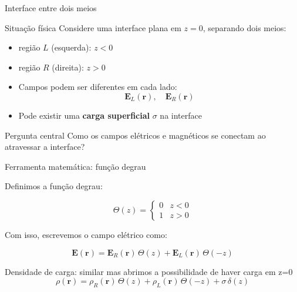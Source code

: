 \documentclass[aspectratio=169]{beamer}
\begin{document}
\begin{frame}{Interface entre dois meios}
\small

\begin{block}{Situação física}
Considere uma interface plana em \(z=0\), separando dois meios:
\begin{itemize}
\item região \(L\) (esquerda): \(z<0\)
\item região \(R\) (direita): \(z>0\)
\end{itemize}
\end{block}

\vspace{0.1cm}

\begin{itemize}\setlength{\itemsep}{2pt}
\item Campos podem ser diferentes em cada lado:
\[
\mathbf{E}_L(\mathbf{r}), \quad \mathbf{E}_R(\mathbf{r})
\]
\item Pode existir uma \textbf{carga superficial} \(\sigma\) na interface
\end{itemize}

\vspace{0.1cm}

\begin{alertblock}{Pergunta central}
Como os campos elétricos e magnéticos se conectam ao atravessar a interface?
\end{alertblock}

\end{frame}

\begin{frame}{Ferramenta matemática: função degrau}
\small

Definimos a função degrau:

\begin{equation}
\Theta(z)=
\begin{cases}
0 & z<0 \\
1 & z>0
\end{cases}
\tag{2.44}
\end{equation}

\vspace{0.1cm}

Com isso, escrevemos o campo elétrico como:

\begin{equation}
\mathbf{E}(\mathbf{r})
=
\mathbf{E}_R(\mathbf{r})\,\Theta(z)
+
\mathbf{E}_L(\mathbf{r})\,\Theta(-z)
\tag{2.45}
\end{equation}

\vspace{0.1cm}

\begin{block}{Densidade de carga: similar mas abrimos a possibilidade de haver carga em z=0}
\begin{equation}
\rho(\mathbf{r})
=
\rho_R(\mathbf{r})\,\Theta(z)
+
\rho_L(\mathbf{r})\,\Theta(-z)
+
\sigma\,\delta(z)
\tag{2.46}
\end{equation}
\end{block}

\end{frame}
\end{document}
